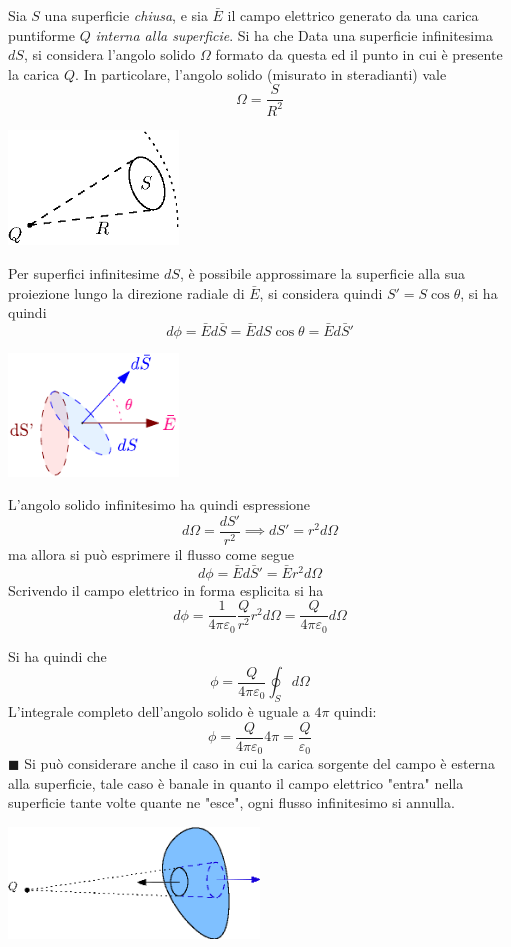 \documentclass[10pt, letterpaper]{report}
\begin{document}
 Sia $S$ una superficie \textit{chiusa}, e sia $\bar E$ il campo elettrico generato da una carica puntiforme $Q$ \textit{interna alla superficie}. Si ha che 
\dimo{}
Data una superficie infinitesima $dS$, si considera l'angolo solido $\Omega$ formato da questa ed il punto in cui è presente la carica $Q$. In particolare, l'angolo solido (misurato in steradianti) vale 
$$ \Omega = \frac{S}{R^2}$$
\begin{center}
    \includegraphics[width=0.34\textwidth]{images/angoloSolido.eps}
\end{center}
Per superfici infinitesime $dS$, è possibile approssimare la superficie alla sua proiezione lungo la direzione radiale di $\bar E$, si considera quindi $S'=S\cos\theta$, si ha quindi 
$$ d\phi=\bar Ed\bar S = \bar EdS\cos\theta = \bar E d\bar S'$$
\begin{center}
    \includegraphics[width=0.34\textwidth]{images/approssAngolo.pdf}
\end{center}
L'angolo solido infinitesimo ha quindi espressione 
$$ d\Omega=\frac{dS'}{r^2}\implies dS'=r^2d\Omega$$
ma allora si può esprimere il flusso come segue 
$$ d\phi=\bar E d\bar S'=\bar Er^2d\Omega$$
Scrivendo il campo elettrico in forma esplicita si ha 
$$d\phi= \frac{1}{4\pi\varepsilon_0}\frac{Q}{r^2}r^2d\Omega=\frac{Q}{4\pi\varepsilon_0}d\Omega$$
\begin{quote}
\end{quote}
Si ha quindi che 
$$\phi = \frac{Q}{4\pi\varepsilon_0}\oint_Sd\Omega$$ 
L'integrale completo dell'angolo solido è uguale a $4\pi$ quindi:$$\phi=\frac{Q}{4\pi\varepsilon_0}4\pi = \frac{Q}{\varepsilon_0}$$
\hfill $\blacksquare$ \acc
Si può considerare anche il caso in cui la carica sorgente del campo è esterna alla superficie, tale caso è banale in quanto il campo elettrico "entra" nella superficie tante volte quante ne "esce", ogni flusso infinitesimo si annulla.\begin{center}
    \includegraphics[width=0.5\textwidth]{images/caricaEst.eps}
\end{center}
\end{document}
